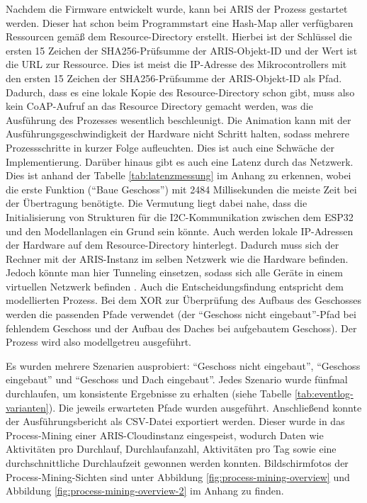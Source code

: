 Nachdem die Firmware entwickelt wurde, kann bei ARIS der Prozess gestartet werden. Dieser hat schon beim Programmstart eine Hash-Map aller verfügbaren Ressourcen
gemäß dem Resource-Directory erstellt. Hierbei ist der Schlüssel die ersten 15 Zeichen der SHA256-Prüfsumme der ARIS-Objekt-ID und der Wert ist die URL
zur Ressource. Dies ist meist die IP-Adresse des Mikrocontrollers mit den ersten 15 Zeichen der SHA256-Prüfsumme der ARIS-Objekt-ID als Pfad. Dadurch, dass
es eine lokale Kopie des Resource-Directory schon gibt, muss also kein CoAP-Aufruf an das Resource Directory gemacht werden, was die Ausführung des Prozesses wesentlich
beschleunigt. Die Animation kann mit der Ausführungsgeschwindigkeit der Hardware nicht Schritt halten, sodass mehrere Prozessschritte in kurzer Folge aufleuchten. Dies ist auch eine Schwäche der Implementierung. Darüber hinaus gibt es auch eine Latenz durch das Netzwerk. Dies ist anhand der Tabelle \ref{tab:latenzmessung} im Anhang zu erkennen, wobei die erste Funktion (``Baue Geschoss'') mit 2484 Millisekunden die meiste Zeit bei der Übertragung benötigte. Die Vermutung liegt dabei nahe, dass die Initialisierung von Strukturen für die \ac{I2C}-Kommunikation zwischen dem ESP32 und den Modellanlagen ein Grund sein könnte. Auch werden
lokale IP-Adressen der Hardware auf dem Resource-Directory hinterlegt. Dadurch muss sich der Rechner mit der ARIS-Instanz im selben Netzwerk wie die Hardware befinden.
Jedoch könnte man hier Tunneling einsetzen, sodass sich alle Geräte in einem virtuellen Netzwerk befinden \cite{penaflor_rey_designing_2022} \cite{dymora_performance_2014}. Auch die Entscheidungsfindung entspricht dem modellierten Prozess. Bei dem XOR
zur Überprüfung des Aufbaus des Geschosses werden die passenden Pfade verwendet (der ``Geschoss nicht eingebaut''-Pfad bei fehlendem Geschoss und der Aufbau des Daches bei aufgebautem Geschoss).
Der Prozess wird also modellgetreu ausgeführt.

\noindent Es wurden mehrere Szenarien ausprobiert: ``Geschoss nicht eingebaut'', ``Geschoss eingebaut'' und ``Geschoss und Dach eingebaut''. Jedes Szenario wurde fünfmal durchlaufen, um konsistente Ergebnisse
zu erhalten (siehe Tabelle \ref{tab:eventlog-varianten}). Die jeweils erwarteten Pfade wurden ausgeführt. Anschließend konnte der Ausführungsbericht als CSV-Datei exportiert werden. Dieser wurde in das Process-Mining einer ARIS-Cloudinstanz eingespeist, wodurch
Daten wie Aktivitäten pro Durchlauf, Durchlaufanzahl, Aktivitäten pro Tag sowie eine durchschnittliche Durchlaufzeit gewonnen werden konnten. Bildschirmfotos der Process-Mining-Sichten sind unter Abbildung \ref{fig:process-mining-overview} und
Abbildung \ref{fig:process-mining-overview-2} im Anhang zu finden.

